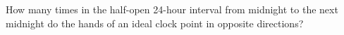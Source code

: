 How many times in the half-open 24-hour interval from midnight to the next midnight do the hands of an ideal clock point in opposite directions?
